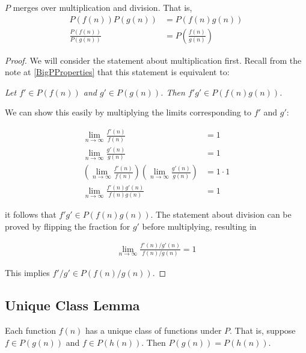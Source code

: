 \begin{theorem}
	$P$ merges over multiplication and division. That is,
	\begin{align*}
	P(f(n))P(g(n)) &= P(f(n)g(n))\\
	\frac {P(f(n))} {P(g(n))} &= P\left(\frac{f(n)} {g(n)}\right)
	\end{align*}
\end{theorem}

\begin{proof}
	We will consider the statement about multiplication first. Recall from the note at \ref{BigPProperties} that this statement is equivalent to:
	
	\textit{Let $f' \in P(f(n))$ and $g' \in P(g(n))$. Then $f'g' \in P(f(n)g(n))$.}
	
	We can show this easily by multiplying the limits corresponding to $f'$ and $g'$:
	
	\begin{align*}
	\lim_{n \to \infty} \frac{f'(n)}{f(n)} &= 1\\
	\lim_{n \to \infty} \frac{g'(n)}{g(n)} &= 1\\
	\left( \lim_{n \to \infty} \frac{f'(n)}{f(n)} \right) \left( \lim_{n \to \infty} \frac{g'(n)}{g(n)} \right) &= 1 \cdot 1\\
	\lim_{n \to \infty} \frac{f'(n)g'(n)}{f(n)g(n)} &= 1
	\end{align*}
	
	it follows that $f'g' \in P(f(n)g(n))$. The statement about division can be proved by flipping the fraction for $g'$ before multiplying, resulting in
	
	\begin{align*}
	\lim_{n \to \infty} \frac{f'(n) / g'(n)}{f(n) / g(n)} = 1
	\end{align*}
	
	This implies $f' / g' \in P(f(n) / g(n))$.
\end{proof}

\subsection{Unique Class Lemma}
\label{UniqueClassOfFunctions}

\begin{lemma}
	Each function $f(n)$ has a unique class of functions under $P$. That is, suppose $f \in P(g(n))$ and $f \in P(h(n))$. Then $P(g(n)) = P(h(n))$.
\end{lemma}


